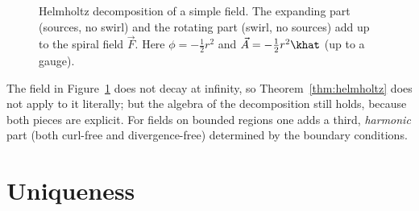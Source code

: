 \begin{figure}[ht]
\centering
{}
\caption{Helmholtz decomposition of a simple field. The expanding part (sources, no swirl) and the rotating part (swirl, no sources) add up to the spiral field $\vec F$. Here $\phi=-\tfrac12r^2$ and $\vec A=-\tfrac12 r^2\khat$ (up to a gauge).}
\label{fig:helmexample}
\end{figure}

\begin{remark}
The field in Figure~\ref{fig:helmexample} does not decay at infinity, so Theorem~\ref{thm:helmholtz} does not apply to it literally; but the algebra of the decomposition still holds, because both pieces are explicit. For fields on bounded regions one adds a third, \emph{harmonic} part (both curl-free and divergence-free) determined by the boundary conditions.
\end{remark}

\section{Uniqueness}

